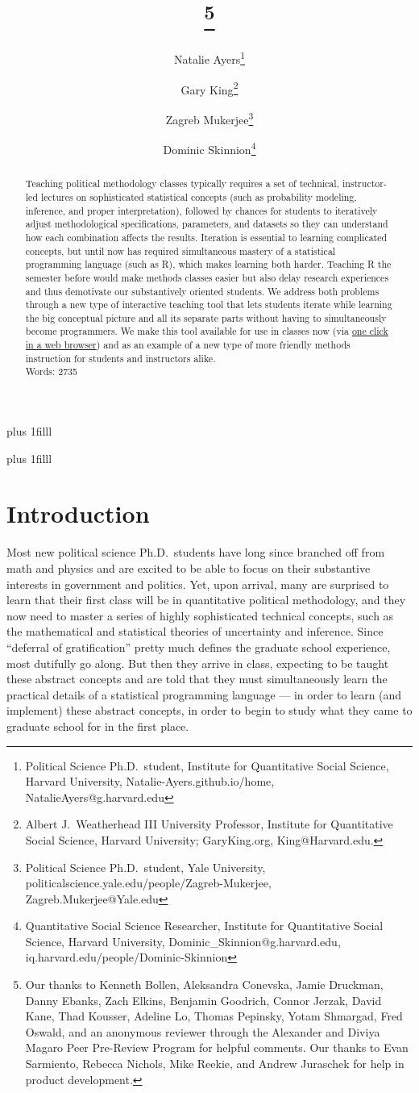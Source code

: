\documentclass[12pt]{article}
\title{\titl}
\title{\titl\thanks{Our thanks to Kenneth Bollen, Aleksandra Conevska, Jamie Druckman, Danny Ebanks, Zach Elkins, Benjamin Goodrich, Connor Jerzak, David Kane, Thad Kousser, Adeline Lo, Thomas Pepinsky, Yotam Shmargad, Fred Oswald, and an anonymous reviewer through the Alexander and Diviya Magaro Peer Pre-Review Program for helpful comments. Our thanks to Evan Sarmiento, Rebecca Nichols, Mike Reekie, and Andrew Juraschek for help in product development.}}
\author{Natalie Ayers\thanks{Political Science Ph.D.\ student, Institute for Quantitative Social Science, Harvard University, Natalie-Ayers.github.io/home, NatalieAyers@g.harvard.edu}\and Gary King\thanks{Albert J.\ Weatherhead
III University Professor, Institute for Quantitative Social
Science, Harvard University; GaryKing.org, King@Harvard.edu.}\and Zagreb Mukerjee\thanks{Political Science Ph.D.\ student, Yale University, politicalscience.yale.edu/people/Zagreb-Mukerjee, Zagreb.Mukerjee@Yale.edu} \and Dominic Skinnion\thanks{Quantitative Social Science Researcher, Institute for Quantitative Social Science, Harvard University, Dominic\_Skinnion@g.harvard.edu, iq.harvard.edu/people/Dominic-Skinnion}}
\newcommand{\btVFill}{\vskip0pt plus 1filll}
\theoremstyle{definition}
\begin{document}
\maketitle\thispagestyle{empty}\setcounter{page}{0}
\btVFill
\vspace{-2\baselineskip}
\begin{abstract}
  \noindent Teaching political methodology classes typically requires a set of technical, instructor-led lectures on sophisticated statistical concepts (such as probability modeling, inference, and proper interpretation), followed by chances for students to iteratively adjust methodological specifications, parameters, and datasets so they can understand how each combination affects the results. Iteration is essential to learning complicated concepts, but until now has required simultaneous mastery of a statistical programming language (such as R), which makes learning both harder. Teaching R the semester before would make methods classes easier but also delay research experiences and thus demotivate our substantively oriented students. We address both problems through a new type of interactive teaching tool that lets students iterate while learning the big conceptual picture and all its separate parts without having to simultaneously become programmers.  We make this tool available for use in classes now (via \href{https://2k1.iq.harvard.edu}{one click in a web browser}) and as an example of a new type of more friendly methods instruction for students and instructors alike.
  \\
  \newline
  \noindent Words: 2735
\end{abstract}
\btVFill
\clearpage
{}\baselineskip

\section{Introduction}\label{s:intro}

Most new political science Ph.D.\ students have long since branched off from math and physics and are excited to be able to focus on their substantive interests in government and politics. Yet, upon arrival, many are surprised to learn that their first class will be in quantitative political methodology, and they now need to master a series of highly sophisticated technical concepts, such as the mathematical and statistical theories of uncertainty and inference. Since ``deferral of gratification'' pretty much defines the graduate school experience, most dutifully go along. But then they arrive in class, expecting to be taught these abstract concepts and are told that they must simultaneously learn the practical details of a statistical programming language --- in order to learn (and implement) these abstract concepts, in order to begin to study what they came to graduate school for in the first place.
\end{document}
